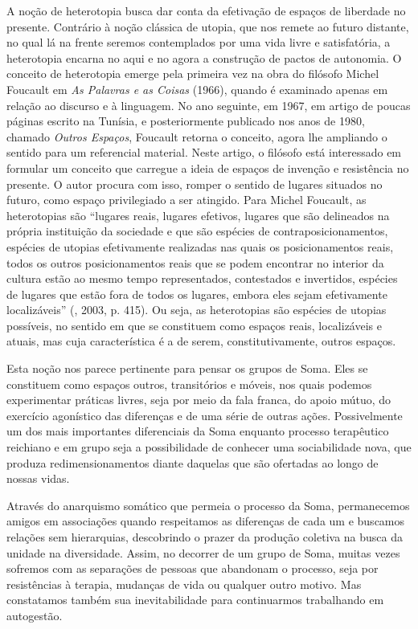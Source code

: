 A noção de heterotopia busca dar conta da efetivação de espaços de
liberdade no presente. Contrário à noção clássica de utopia, que nos
remete ao futuro distante, no qual lá na frente seremos contemplados por
uma vida livre e satisfatória, a heterotopia encarna no aqui e no agora
a construção de pactos de autonomia. O conceito de heterotopia emerge
pela primeira vez na obra do filósofo Michel Foucault em \emph{As
Palavras e as Coisas} (1966), quando é examinado apenas em relação ao
discurso e à linguagem. No ano seguinte, em 1967, em artigo de poucas
páginas escrito na Tunísia, e posteriormente publicado nos anos de 1980,
chamado \emph{Outros Espaços}, Foucault retorna o conceito, agora lhe
ampliando o sentido para um referencial material. Neste artigo, o
filósofo está interessado em formular um conceito que carregue a ideia
de espaços de invenção e resistência no presente. O autor procura com
isso, romper o sentido de lugares situados no futuro, como espaço
privilegiado a ser atingido. Para Michel Foucault, as heterotopias são
``lugares reais, lugares efetivos, lugares que são delineados na própria
instituição da sociedade e que são espécies de contraposicionamentos,
espécies de utopias efetivamente realizadas nas quais os posicionamentos
reais, todos os outros posicionamentos reais que se podem encontrar no
interior da cultura estão ao mesmo tempo representados, contestados e
invertidos, espécies de lugares que estão fora de todos os lugares,
embora eles sejam efetivamente localizáveis'' (, 2003, p. 415).
Ou seja, as heterotopias são espécies de utopias possíveis, no sentido
em que se constituem como espaços reais, localizáveis e atuais, mas cuja
característica é a de serem, constitutivamente, outros espaços.

Esta noção nos parece pertinente para pensar os grupos de Soma. Eles se
constituem como espaços outros, transitórios e móveis, nos quais podemos
experimentar práticas livres, seja por meio da fala franca, do apoio
mútuo, do exercício agonístico das diferenças e de uma série de outras
ações. Possivelmente um dos mais importantes diferenciais da Soma
enquanto processo terapêutico reichiano e em grupo seja a possibilidade
de conhecer uma sociabilidade nova, que produza redimensionamentos
diante daquelas que são ofertadas ao longo de nossas vidas.

Através do anarquismo somático que permeia o processo da Soma,
permanecemos amigos em associações quando respeitamos as diferenças de
cada um e buscamos relações sem hierarquias, descobrindo o prazer da
produção coletiva na busca da unidade na diversidade. Assim, no decorrer
de um grupo de Soma, muitas vezes sofremos com as separações de pessoas
que abandonam o processo, seja por resistências à terapia, mudanças de
vida ou qualquer outro motivo. Mas constatamos também sua
inevitabilidade para continuarmos trabalhando em autogestão.

